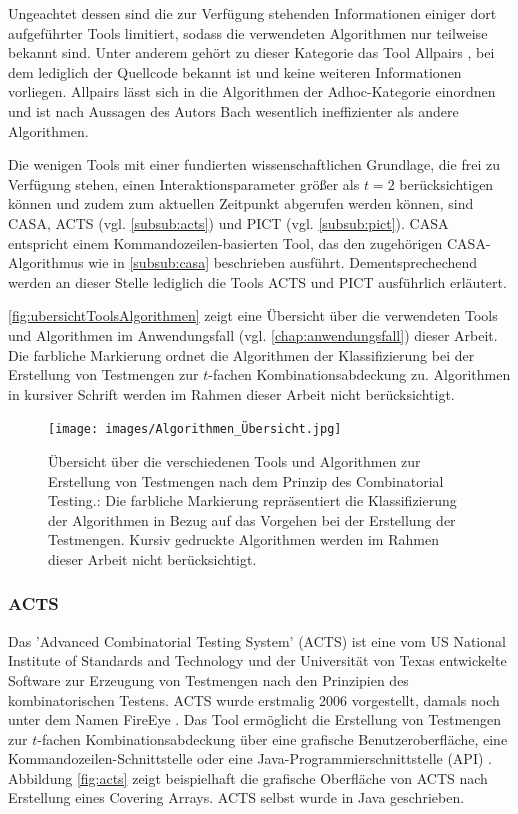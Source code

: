 Ungeachtet dessen sind die zur Verfügung stehenden Informationen einiger dort aufgeführter Tools limitiert, sodass die verwendeten Algorithmen nur teilweise bekannt sind. Unter anderem gehört zu dieser Kategorie das Tool Allpairs \cite{bach2012allpairs}, bei dem lediglich der Quellcode bekannt ist und keine weiteren Informationen vorliegen. Allpairs lässt sich in die Algorithmen der Adhoc-Kategorie einordnen und ist nach Aussagen des Autors Bach \cite{bach2012allpairs} wesentlich ineffizienter als andere Algorithmen.

Die wenigen Tools mit einer fundierten wissenschaftlichen Grundlage, die frei zu Verfügung stehen, einen Interaktionsparameter größer als $t=2$ berücksichtigen können und zudem zum aktuellen Zeitpunkt abgerufen werden können, sind CASA, ACTS (vgl. \autoref{subsub:acts}) und PICT (vgl. \autoref{subsub:pict}). CASA entspricht einem Kommandozeilen-basierten Tool, das den zugehörigen CASA-Algorithmus wie in \autoref{subsub:casa} beschrieben ausführt. Dementsprechechend werden an dieser Stelle lediglich die Tools ACTS und PICT ausführlich erläutert.

\autoref{fig:ubersichtToolsAlgorithmen} zeigt eine Übersicht über die verwendeten Tools und Algorithmen im Anwendungsfall (vgl. \autoref{chap:anwendungsfall}) dieser Arbeit. Die farbliche Markierung ordnet die Algorithmen der Klassifizierung bei der Erstellung von Testmengen zur $t$-fachen Kombinationsabdeckung zu. Algorithmen in kursiver Schrift werden im Rahmen dieser Arbeit nicht berücksichtigt.

\begin{figure}[!htb]
\centering
\texttt{[image: images/Algorithmen\_Übersicht.jpg]}
\caption{Übersicht über die verschiedenen Tools und Algorithmen zur Erstellung von Testmengen nach dem Prinzip des Combinatorial Testing.: Die farbliche Markierung repräsentiert die Klassifizierung der Algorithmen in Bezug auf das Vorgehen bei der Erstellung der Testmengen. Kursiv gedruckte Algorithmen werden im Rahmen dieser Arbeit nicht berücksichtigt.}
\label{fig:ubersichtToolsAlgorithmen}
\end{figure}

\subsubsection{ACTS}\label{subsub:acts}

Das 'Advanced Combinatorial Testing System' (ACTS) \cite{yu2013acts} ist eine vom US National Institute of Standards and Technology und der Universität von Texas entwickelte Software zur Erzeugung von Testmengen nach den Prinzipien des kombinatorischen Testens. ACTS wurde erstmalig 2006 vorgestellt, damals noch unter dem Namen FireEye \cite{lei2007ipog}. Das Tool ermöglicht die Erstellung von Testmengen zur $t$-fachen Kombinationsabdeckung über eine grafische Benutzeroberfläche, eine Kommandozeilen-Schnittstelle oder eine Java-Programmierschnittstelle (API) \cite{yu2013acts}. Abbildung \ref{fig:acts} zeigt beispielhaft die grafische Oberfläche von ACTS nach Erstellung eines Covering Arrays. ACTS selbst wurde in Java geschrieben.

